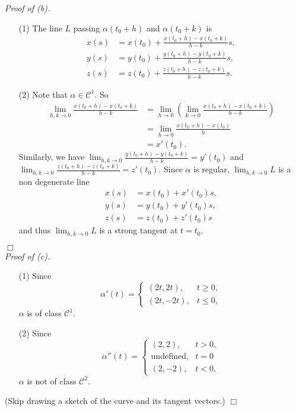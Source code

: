 \documentclass{article}
\begin{document}
\emph{Proof of (b).}
\begin{enumerate}
\item[(1)]
  The line $L$ passing $\alpha(t_0+h)$ and $\alpha(t_0+k)$ is
  \begin{align*}
    x(s) &= x(t_0) + \frac{x(t_0+h)-x(t_0+k)}{h-k} s, \\
    y(s) &= y(t_0) + \frac{y(t_0+h)-y(t_0+k)}{h-k} s, \\
    z(s) &= z(t_0) + \frac{z(t_0+h)-z(t_0+k)}{h-k} s.
  \end{align*}

\item[(2)]
  Note that $\alpha \in \mathcal{C}^{1}$.
  So
  \begin{align*}
    \lim_{h,k \to 0} \frac{x(t_0+h)-x(t_0+k)}{h-k}
    &=
    \lim_{h \to 0} \left( \lim_{k \to 0} \frac{x(t_0+h)-x(t_0+k)}{h-k} \right) \\
    &=
    \lim_{h \to 0} \frac{x(t_0+h)-x(t_0)}{h} \\
    &= x'(t_0).
  \end{align*}
  Similarly, we have $\lim_{h,k \to 0} \frac{y(t_0+h)-y(t_0+k)}{h-k} = y'(t_0)$ and
  $\lim_{h,k \to 0} \frac{z(t_0+h)-z(t_0+k)}{h-k} = z'(t_0)$.
  Since $\alpha$ is regular,
  $\lim_{h,k \to 0} L$ is a non degenerate line
  \begin{align*}
    x(s) &= x(t_0) + x'(t_0) s, \\
    y(s) &= y(t_0) + y'(t_0) s, \\
    z(s) &= z(t_0) + z'(t_0) s
  \end{align*}
  and thus $\lim_{h,k \to 0} L$ is a strong tangent at $t = t_0$.
\end{enumerate}
$\Box$ \\



\emph{Proof of (c).}
\begin{enumerate}
\item[(1)]
  Since
  \begin{equation*}
    \alpha'(t) =
    \begin{cases}
       (2t,2t), & t \geq 0, \\
       (2t,-2t), & t \leq 0,
    \end{cases}
  \end{equation*}
  $\alpha$ is of class $\mathcal{C}^{1}$.

\item[(2)]
  Since
  \begin{equation*}
    \alpha''(t) =
    \begin{cases}
       (2,2), & t > 0, \\
       \text{undefined}, & t = 0 \\
       (2,-2), & t < 0,
    \end{cases}
  \end{equation*}
  $\alpha$ is not of class $\mathcal{C}^{2}$.
\end{enumerate}
(Skip drawing a sketch of the curve and its tangent vectors.)
$\Box$ \\\\
\end{document}
